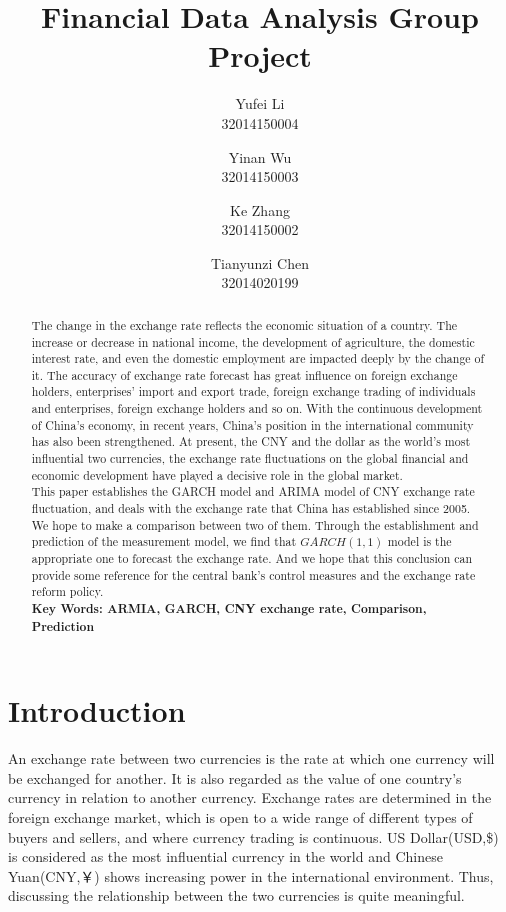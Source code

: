 \documentclass[12pt, a4paper, titlepage]{article}
\title{Financial Data Analysis Group Project\\
}
\author{Yufei Li  \\
	32014150004  \\
	\and 
	Yinan Wu \\
	32014150003 \\
	\and
	Ke Zhang\\
	32014150002\\
	\and
	Tianyunzi Chen\\
	32014020199
	}
\date{}
\begin{document}
\maketitle

\begin{abstract}
The change in the exchange rate reflects the economic situation of a country. The increase or decrease in national income, the development of agriculture, the domestic interest rate, and even the domestic employment are impacted deeply by the change of it. The accuracy of exchange rate forecast has great influence on foreign exchange holders, enterprises' import and export trade, foreign exchange trading of individuals and enterprises, foreign exchange holders and so on. With the continuous development of China's economy, in recent years, China's position in the international community has also been strengthened. At present, the CNY and the dollar as the world's most influential two currencies, the exchange rate fluctuations on the global financial and economic development have played a decisive role in the global market.\\

This paper establishes the GARCH model and ARIMA model of CNY exchange rate fluctuation, and deals with the exchange rate that China has established since 2005. We hope to make a comparison between two of them. Through the establishment and prediction of the measurement model, we find that $GARCH(1,1)$ model is the appropriate one to forecast the exchange rate. And we hope that this conclusion can provide some reference for the central bank's control measures and the exchange rate reform policy.\\

\textbf{Key Words: ARMIA, GARCH, CNY exchange rate, Comparison, Prediction} 
\end{abstract}

\tableofcontents 
\newpage

\section{Introduction}
An exchange rate between two currencies is the rate at which one currency will be exchanged for another. It is also regarded as the value of one country’s currency in relation to another currency. Exchange rates are determined in the foreign exchange market, which is open to a wide range of different types of buyers and sellers, and where currency trading is continuous. US Dollar(USD,\$) is considered as the most influential currency in the world and Chinese Yuan(CNY,￥) shows increasing power in the international environment. Thus, discussing the relationship between the two currencies is quite meaningful.\\
 
\end{document}
